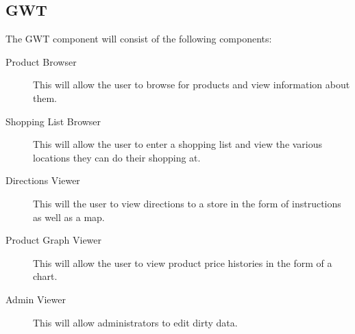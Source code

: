 \subsection{GWT}
The GWT component will consist of the following components:
\begin{description}
\item[Product Browser] This will allow the user to browse for products and view information about them.
\item[Shopping List Browser] This will allow the user to enter a shopping list and view the various locations they can do  their shopping at.
\item[Directions Viewer] This will the user to view directions to a store in the form of instructions as well as a map.
\item[Product Graph Viewer] This will allow the user to view product price histories in the form of a chart.
\item[Admin Viewer] This will allow administrators to edit dirty data.
\end{description} 






